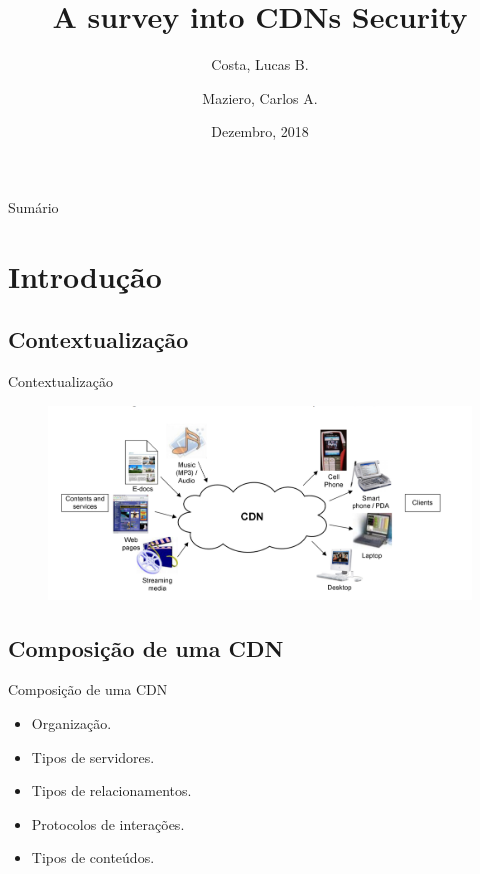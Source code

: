 \documentclass{beamer}
\title{A survey into CDNs Security}
\author{Costa, Lucas B.\inst{1} \and Maziero, Carlos A.\inst{2}}
\institute[Universidade Federal do Paran\'a] %
{
  \inst{1}%
  Departamento de Inform\'atica\\
  UFPR
}
\date{Dezembro, 2018}
\begin{document}
\begin{frame}
  \titlepage
\end{frame}

\begin{frame}{Sum\'ario}
  \tableofcontents
\end{frame}

\section{Introdu\c{c}\~ao}

\subsection{Contextualiza\c{c}\~ao}

\begin{frame}{Contextualiza\c{c}\~ao}
\begin{figure} 
\includegraphics[width=13cm]{Figuras/contextualizacao.png} %
\label{figura:contextualizacao} 
\end{figure}
\end{frame}

\subsection{Composi\c{c}\~ao de uma CDN}

\begin{frame}{Composi\c{c}\~ao de uma CDN}
  \begin{itemize}
  \item {
    Organiza\c{c}\~ao.
    \pause
  }
  \item {   
    Tipos de servidores.
  }
  \item<3-> {
    Tipos de relacionamentos.
  }
  \item<4-> {
    Protocolos de intera\c{c}\~oes.
  }
  \item<5-> {
    Tipos de conte\'udos.
  }
  \end{itemize}
\end{frame}
\end{document}
